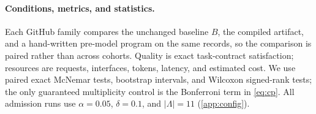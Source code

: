 \paragraph{Conditions, metrics, and statistics.}
Each GitHub family compares the unchanged baseline $B$, the compiled artifact,
and a hand-written pre-model program on the same records, so the comparison is
paired rather than across cohorts. Quality is exact task-contract satisfaction;
resources are requests, interfaces, tokens, latency, and estimated cost. We use
paired exact McNemar tests, bootstrap intervals, and Wilcoxon signed-rank tests;
the only guaranteed multiplicity control is the Bonferroni term in
\cref{eq:cp}. All admission runs use $\alpha=0.05$, $\delta=0.1$, and
$|\Lambda|=11$ (\cref{app:config}).
